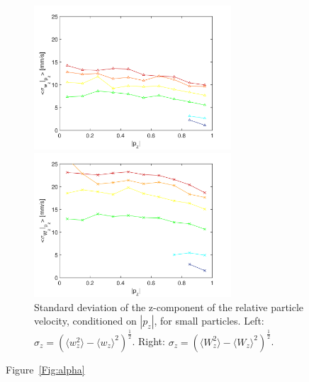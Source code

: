 \documentclass[]{jfm}
\begin{document}
\begin{figure}
\centering
\begin{minipage}{.5\textwidth}
  \centering
  \includegraphics[width=2.9in]{figures/wz-local-sigma-small.pdf}
\end{minipage}%
\begin{minipage}{.5\textwidth}
  \centering
  \includegraphics[width=2.9in]{figures/wz-U-sigma-small.pdf}
\end{minipage}
\caption{Standard deviation of the z-component of the relative particle velocity, conditioned on $|p_z|$, for small particles. Left: $\sigma_z=(\langle w_z^2 \rangle-\langle w_z \rangle^2)^{\frac{1}{2}}$. Right: $\sigma_z=(\langle W_z^2 \rangle-\langle W_z \rangle^2)^{\frac{1}{2}}$.}
\label{Fig:wz-sigma}
\end{figure}

Figure~\ref{Fig:alpha}
\end{document}
